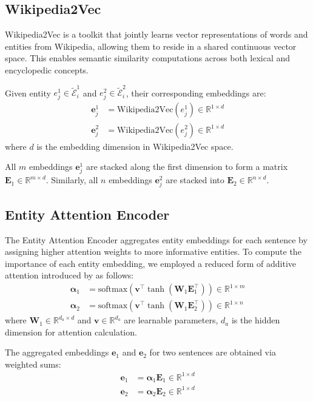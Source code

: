 \documentclass{llncs}
\begin{document}
\subsection{Wikipedia2Vec}
Wikipedia2Vec \parencite{yamada2020wikipedia2vec} is a toolkit that jointly learns vector representations of words and entities from Wikipedia, allowing them to reside in a shared continuous vector space. This enables semantic similarity computations across both lexical and encyclopedic concepts.

Given entity $e^1_j \in \tilde{\mathcal{E}}^1_i$ and $e^2_j \in \tilde{\mathcal{E}}^2_i$, their corresponding embeddings are:
\begin{align}
    \mathbf{e}^1_j &= \mathrm{Wikipedia2Vec}(e^1_j) \in \mathbb{R}^{1 \times d} \\
    \mathbf{e}^2_j &= \mathrm{Wikipedia2Vec}(e^2_j) \in \mathbb{R}^{1 \times d}
\end{align}
where $d$ is the embedding dimension in Wikipedia2Vec space.

All $m$ embeddings $\mathbf{e}^1_j$ are stacked along the first dimension to form a matrix $\mathbf{E}_1 \in \mathbb{R}^{m \times d}$. Similarly, all $n$ embeddings $\mathbf{e}^2_j$ are stacked into $\mathbf{E}_2 \in \mathbb{R}^{n \times d}$.

\subsection{Entity Attention Encoder}
The Entity Attention Encoder aggregates entity embeddings for each sentence by assigning higher attention weights to more informative entities. To compute the importance of each entity embedding, we employed a reduced form of additive attention introduced by \textcite{bahdanau2016} as follows:
\begin{align}
    \boldsymbol{\alpha}_1 &= \mathrm{softmax} \left( \mathbf{v}^\top \tanh(\mathbf{W}_1 \mathbf{E}_1^\top) \right) \in \mathbb{R}^{1 \times m} \\
    \boldsymbol{\alpha}_2 &= \mathrm{softmax} \left( \mathbf{v}^\top \tanh(\mathbf{W}_1 \mathbf{E}_2^\top) \right) \in \mathbb{R}^{1 \times n}
\end{align}
where $\mathbf{W}_1 \in \mathbb{R}^{d_a \times d}$ and $\mathbf{v} \in \mathbb{R}^{d_a}$ are learnable parameters, $d_a$ is the hidden dimension for attention calculation.

The aggregated embeddings $\mathbf{e}_1$ and $\mathbf{e}_2$ for two sentences are obtained via weighted sums:
\begin{align}
    \mathbf{e}_1 &= \boldsymbol{\alpha}_1 \mathbf{E}_1 \in \mathbb{R}^{1 \times d} \\
    \mathbf{e}_2 &= \boldsymbol{\alpha}_2 \mathbf{E}_2 \in \mathbb{R}^{1 \times d}
\end{align}
\end{document}
